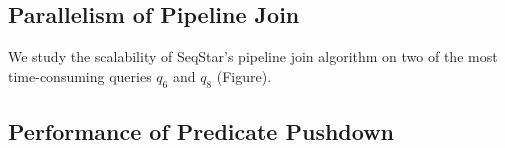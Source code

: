 \subsection{Parallelism of Pipeline Join}\label{sec:experiments_join}
We study the scalability of SeqStar's pipeline join algorithm on two of the most time-consuming queries $q_6$ and $q_8$ (Figure).
\subsection{Performance of Predicate Pushdown}
